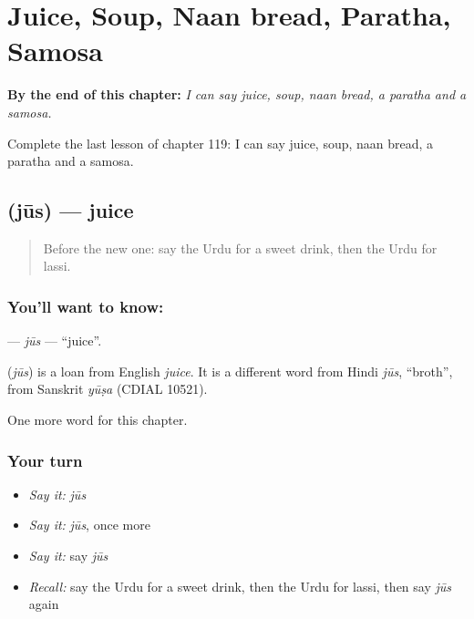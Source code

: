 
\chapter{Juice, Soup, Naan bread, Paratha, Samosa}
\label{ch:ur-juice-soup-naan-bread-paratha-samosa}

\begin{chapteropening}
\textbf{By the end of this chapter:} \emph{I can say juice, soup, naan bread, a paratha and a samosa.}

Complete the last lesson of chapter 119: I can say juice, soup, naan bread, a paratha and a samosa.
\end{chapteropening}

\section[\texorpdfstring{\ur{جوس} (jūs)}{جوس (jūs)}]{ (jūs) — juice}

\label{lesson:UR-C119-jus}



\begin{quote}
Before the new one: say the Urdu for a sweet drink, then the Urdu for lassi.
\end{quote}

\subsection*{You'll want to know: }
\textbf{} — \emph{jūs} — \textquotedblleft{}juice\textquotedblright{}.

\begin{cousinweb}
\textbf{} (\emph{jūs}) is a loan from English \emph{juice}. It is a different word from Hindi \emph{jūs}, \textquotedblleft{}broth\textquotedblright{}, from Sanskrit \emph{yūṣa} (CDIAL 10521).
\end{cousinweb}

\begin{grammarlens}[title={What you've built}]
One more word for this chapter.
\end{grammarlens}

\subsection*{Your turn}
\begin{itemize}
\raggedright
  \item \emph{Say it:} \emph{jūs}
  \item \emph{Say it:} \emph{jūs}, once more
  \item \emph{Say it:} say \emph{jūs}
  \item \emph{Recall:} say the Urdu for a sweet drink, then the Urdu for lassi, then say \emph{jūs} again
\end{itemize}


